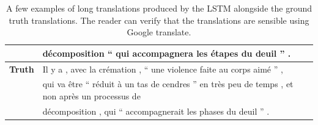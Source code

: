 \begin{table}[ht!]
\begin{footnotesize}
\begin{tabular}{|l|l|}
& d\'{e}composition ``  qui accompagnera les \'{e}tapes du deuil '' .\\
\hline
{\bf Truth} & 
Il y a , avec la cr\'{e}mation , `` une violence faite au corps aim\'{e} '' , \\
& qui va \^{e}tre `` r\'{e}duit \`{a} un tas de cendres '' en tr\`{e}s peu de temps , et non apr\`{e}s un processus de \\
&d\'{e}composition , qui `` accompagnerait les phases du deuil '' .\\
\hline
\end{tabular}
\end{footnotesize}
\caption{A few examples of long translations produced by the LSTM
  alongside the ground truth translations.  The reader can verify that
  the translations are sensible using Google translate.  }
\label{tab:examples}
\end{table}



